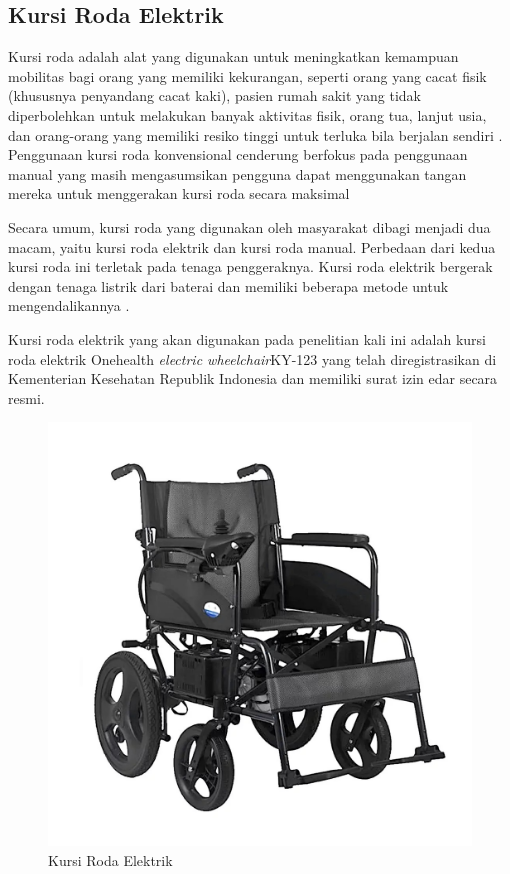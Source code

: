 \subsection{Kursi Roda Elektrik}
Kursi roda adalah alat yang digunakan untuk meningkatkan kemampuan mobilitas bagi orang yang memiliki kekurangan, seperti orang yang cacat fisik (khususnya penyandang cacat kaki), pasien rumah sakit yang tidak diperbolehkan untuk melakukan banyak aktivitas fisik, orang tua, lanjut usia, dan orang-orang yang memiliki resiko tinggi untuk terluka bila berjalan sendiri \parencite{Ady2011}. Penggunaan kursi roda konvensional cenderung berfokus pada penggunaan manual yang masih mengasumsikan pengguna dapat menggunakan tangan mereka untuk menggerakan kursi roda secara maksimal \parencite{sumit2017}

Secara umum, kursi roda yang digunakan oleh masyarakat dibagi menjadi dua macam, yaitu kursi roda elektrik dan kursi roda manual. Perbedaan dari kedua kursi roda ini terletak pada tenaga penggeraknya. Kursi roda elektrik bergerak dengan tenaga listrik dari baterai dan memiliki beberapa metode untuk mengendalikannya \parencite{Fatoni2023}.

Kursi roda elektrik yang akan digunakan pada penelitian kali ini adalah kursi roda elektrik Onehealth \emph{electric wheelchair}KY-123 yang telah diregistrasikan di Kementerian Kesehatan Republik Indonesia dan memiliki surat izin edar secara resmi. 

\begin{figure} [ht] \centering
    \includegraphics[scale=0.25]{gambar/Kursi Roda Elektrik Lipat OneHealth KY123 A.jpg}
    \caption{Kursi Roda Elektrik}
    \label{fig:Proses Flattening}
\end{figure}

